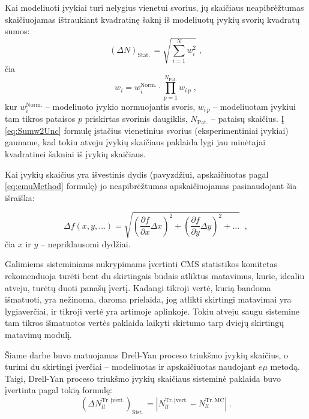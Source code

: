 \documentclass[a4paper, 12pt, oneside]{article}
\newcommand{\emu}{e\mu}
\newlength\q
\begin{document}
Kai modeliuoti įvykiai turi nelygius vienetui svorius, jų skaičiaus neapibrėžtumas skaičiuojamas ištraukiant
kvadratinę šaknį iš modeliuotų įvykių svorių kvadratų sumos:
\begin{equation}
	(\Delta N)_{\mathrm{Stat.\,}} = \sqrt{\sum_{i=1}^{N}w_{i}^{2}} \; ,
	\label{eq:Sumw2Unc}
\end{equation}
čia $$w_{i}=w_{i}^{\mathrm{Norm.}} \cdot \prod_{p=1}^{N_{\mathrm{Pat.}}}w_{i \, p} \; ,$$
kur $w_{i}^{\mathrm{Norm.}}$ -- modeliuoto įvykio normuojantis svoris, $w_{i \, p}$ -- modeliuotam įvykiui tam tikros pataisos $p$ priskirtas
svorinis daugiklis, $N_{\mathrm{Pat.}}$ -- pataisų skaičius.
Į \eqref{eq:Sumw2Unc} formulę įstačius vienetinius svorius (eksperimentiniai įvykiai) gauname, kad tokiu atveju įvykių
skaičiaus paklaida lygi jau minėtajai kvadratinei šakniai iš įvykių skaičiaus.

Kai įvykių skaičius yra išvestinis dydis (pavyzdžiui,  apskaičiuotas pagal \eqref{eq:emuMethod} formulę) jo neapibrėžtumas
 apskaičiuojamas pasinaudojant šia išraiška:

\begin{equation}
	\Delta f(x, y, ...) =
	\sqrt{ \left( \frac{\partial f}{\partial x} \Delta x \right)^{2} +
	\left( \frac{\partial f}{\partial y} \Delta y \right)^{2} + ... } \;\; \mathrm{,}
	\label{eq:DerUnc}
\end{equation}
čia $x$ ir $y$ -- nepriklausomi dydžiai.

Galimiems sisteminiams nukrypimams įvertinti CMS statistikos komitetas rekomenduoja turėti bent du skirtingais būdais
atliktus matavimus, kurie, idealiu atveju, turėtų duoti panašų įvertį.
Kadangi tikroji vertė, kurią bandoma išmatuoti, yra nežinoma, daroma prielaida, jog atlikti skirtingi matavimai yra
lygiaverčiai, ir tikroji vertė yra artimoje aplinkoje.
Tokiu atveju saugu sistemine tam tikros išmatuotos vertės paklaida laikyti skirtumo tarp dviejų skirtingų matavimų
modulį.

Šiame darbe buvo matuojamas Drell-Yan proceso triukšmo įvykių skaičius, o turimi du skirtingi įverčiai -- modeliuotas ir
apskaičiuotas naudojant $\emu$ metodą.
Taigi, Drell-Yan proceso triukšmo įvykių skaičiaus sisteminė paklaida buvo įvertinta pagal tokią formulę:
\begin{equation}
	(\Delta N_{ll}^{\mathrm{Tr. \, įvert.}})_{\mathrm{Sist.\,}} = | N_{ll}^{\mathrm{Tr. \, įvert.}} -
	N_{ll}^{\mathrm{Tr. \, MC}} | \; .
	\label{eq:systUncEmu}
\end{equation}
\end{document}
